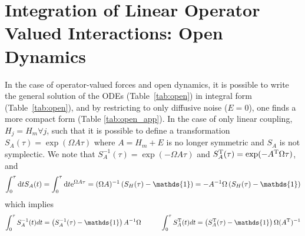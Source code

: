 \documentclass[%
reprint,
superscriptaddress,
nofootinbib,
 amsmath,amssymb,
prx,
floatfix,
]{revtex4-2}
\begin{document}
\section{Integration of Linear Operator Valued Interactions: Open Dynamics \label{app:only_force_open}}

In the case of operator-valued forces and open dynamics, it is possible to write the general solution of the ODEs (Table~\ref{tab:open}) in integral form (Table~\ref{tab:open}), and by restricting to only diffusive noise ($E=0$), one finds a more compact form (Table \ref{tab:open_app}). In the case of only linear coupling, $H_j = H_m \forall j$, such that it is possible to define a transformation $S_A(\tau) = \exp(  \Omega A \tau)$ where $A =H_m + E$ is no longer symmetric and $S_A$ is not symplectic. We note that $S_A^{-1} (\tau) = \exp ( - \Omega A \tau) $ and $S_A^{\rm T} (\tau) = \exp (- A^{\rm T} \Omega \tau) $, and 
\begin{equation}
    \int_0^\tau \text{d}t S_A(t)  =\int_0^\tau \text{d}t {\rm e}^{ \Omega A \tau}  =  ( \Omega A)^{-1} \left(S_H(\tau) - \mathds{1} \right) = - A^{-1} \Omega  \left(S_H(\tau) - \mathds{1} \right)
\end{equation}
which implies 
\begin{equation}
    \int_0^\tau S_A^{-1}(t) dt =    \left(S_A^{-1}(\tau) - \mathds{1} \right) A^{-1} \Omega \hspace{1cm} \int_0^\tau S_A^{\rm T}(t) dt =     \left(S_A^{\rm T}(\tau) - \mathds{1} \right) \Omega  (A^{\rm T})^{-1}
\end{equation}
\end{document}
